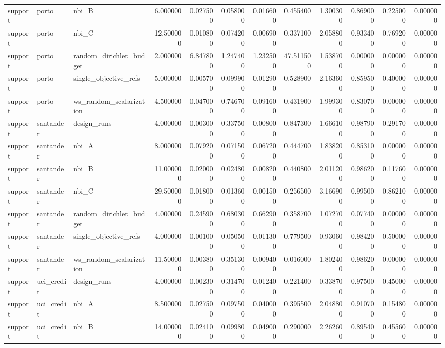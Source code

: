 \begin{landscape}
\begin{longtable}{lllrrrrrrrrr}
support & porto & nbi\_B & 6.000000 & 0.027500 & 0.058000 & 0.016600 & 0.455400 & 1.300300 & 0.869000 & 0.225000 & 0.000000 \\
support & porto & nbi\_C & 12.500000 & 0.010800 & 0.074200 & 0.006900 & 0.337100 & 2.058800 & 0.933400 & 0.769200 & 0.000000 \\
support & porto & random\_dirichlet\_budget & 2.000000 & 6.847800 & 1.247400 & 1.232500 & 47.511500 & 1.538700 & 0.000000 & 0.000000 & 0.000000 \\
support & porto & single\_objective\_refs & 5.000000 & 0.005700 & 0.099900 & 0.012900 & 0.528900 & 2.163600 & 0.859500 & 0.400000 & 0.000000 \\
support & porto & ws\_random\_scalarization & 4.500000 & 0.047000 & 0.746700 & 0.091600 & 0.431900 & 1.999300 & 0.830700 & 0.000000 & 0.000000 \\
support & santander & design\_runs & 4.000000 & 0.003000 & 0.337500 & 0.008000 & 0.847300 & 1.666100 & 0.987900 & 0.291700 & 0.000000 \\
support & santander & nbi\_A & 8.000000 & 0.079200 & 0.071500 & 0.067200 & 0.444700 & 1.838200 & 0.853100 & 0.000000 & 0.000000 \\
support & santander & nbi\_B & 11.000000 & 0.020000 & 0.024800 & 0.008200 & 0.440800 & 2.011200 & 0.986200 & 0.117600 & 0.000000 \\
support & santander & nbi\_C & 29.500000 & 0.018000 & 0.013600 & 0.001500 & 0.256500 & 3.166900 & 0.995000 & 0.862100 & 0.000000 \\
support & santander & random\_dirichlet\_budget & 4.000000 & 0.245900 & 0.680300 & 0.662900 & 0.358700 & 1.072700 & 0.077400 & 0.000000 & 0.000000 \\
support & santander & single\_objective\_refs & 4.000000 & 0.001000 & 0.050500 & 0.011300 & 0.779500 & 0.930600 & 0.984200 & 0.500000 & 0.000000 \\
support & santander & ws\_random\_scalarization & 11.500000 & 0.003800 & 0.351300 & 0.009400 & 0.016000 & 1.802400 & 0.986200 & 0.000000 & 0.000000 \\
support & uci\_credit & design\_runs & 4.000000 & 0.002300 & 0.314700 & 0.012400 & 0.221400 & 0.338700 & 0.975000 & 0.450000 & 0.000000 \\
support & uci\_credit & nbi\_A & 8.500000 & 0.027500 & 0.097500 & 0.040000 & 0.395500 & 2.048800 & 0.910700 & 0.154800 & 0.000000 \\
support & uci\_credit & nbi\_B & 14.000000 & 0.024100 & 0.099800 & 0.049000 & 0.290000 & 2.262600 & 0.895400 & 0.455600 & 0.000000 \\

\end{longtable}
\end{landscape}
